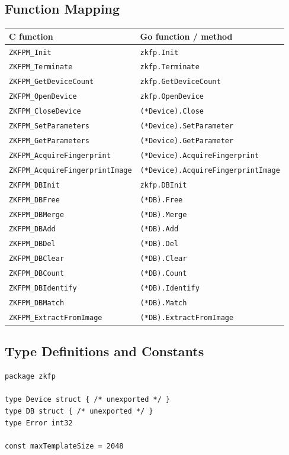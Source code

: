 \documentclass[11pt, a4paper]{article}
\begin{document}
\subsection{Function Mapping}
\begin{table}[htbp]
\centering
\begin{tabularx}{\textwidth}{l X}
\toprule
\textbf{C function} & \textbf{Go function / method} \\
\midrule
\texttt{ZKFPM\_Init} & \texttt{zkfp.Init} \\
\texttt{ZKFPM\_Terminate} & \texttt{zkfp.Terminate} \\
\texttt{ZKFPM\_GetDeviceCount} & \texttt{zkfp.GetDeviceCount} \\
\texttt{ZKFPM\_OpenDevice} & \texttt{zkfp.OpenDevice} \\
\texttt{ZKFPM\_CloseDevice} & \texttt{(*Device).Close} \\
\texttt{ZKFPM\_SetParameters} & \texttt{(*Device).SetParameter} \\
\texttt{ZKFPM\_GetParameters} & \texttt{(*Device).GetParameter} \\
\texttt{ZKFPM\_AcquireFingerprint} & \texttt{(*Device).AcquireFingerprint} \\
\texttt{ZKFPM\_AcquireFingerprintImage} & \texttt{(*Device).AcquireFingerprintImage} \\
\texttt{ZKFPM\_DBInit} & \texttt{zkfp.DBInit} \\
\texttt{ZKFPM\_DBFree} & \texttt{(*DB).Free} \\
\texttt{ZKFPM\_DBMerge} & \texttt{(*DB).Merge} \\
\texttt{ZKFPM\_DBAdd} & \texttt{(*DB).Add} \\
\texttt{ZKFPM\_DBDel} & \texttt{(*DB).Del} \\
\texttt{ZKFPM\_DBClear} & \texttt{(*DB).Clear} \\
\texttt{ZKFPM\_DBCount} & \texttt{(*DB).Count} \\
\texttt{ZKFPM\_DBIdentify} & \texttt{(*DB).Identify} \\
\texttt{ZKFPM\_DBMatch} & \texttt{(*DB).Match} \\
\texttt{ZKFPM\_ExtractFromImage} & \texttt{(*DB).ExtractFromImage} \\
\bottomrule
\end{tabularx}
\end{table}

\subsection{Type Definitions and Constants}
\begin{lstlisting}
package zkfp

type Device struct { /* unexported */ }
type DB struct { /* unexported */ }
type Error int32

const maxTemplateSize = 2048
\end{lstlisting}
\end{document}
